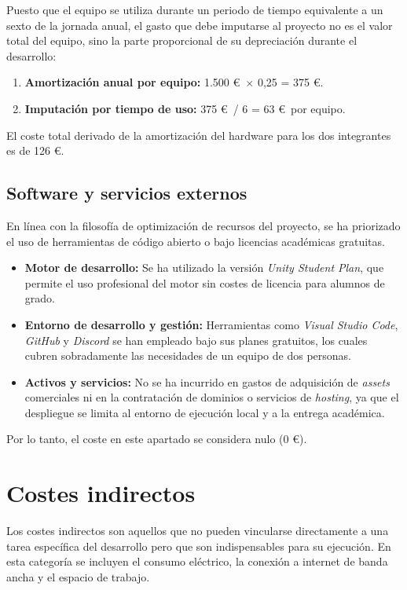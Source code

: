 Puesto que el equipo se utiliza durante un periodo de tiempo equivalente a un sexto de la jornada anual, el gasto que debe imputarse al proyecto no es el valor total del equipo, sino la parte proporcional de su depreciación durante el desarrollo:
\begin{enumerate}
    \item \textbf{Amortización anual por equipo:} 1.500 \euro\ $\times$ 0,25 = 375 \euro.
    \item \textbf{Imputación por tiempo de uso:} 375 \euro\ / 6 = 63 \euro\ por equipo.
\end{enumerate}
El coste total derivado de la amortización del hardware para los dos integrantes es de 126 \euro.

\subsection{Software y servicios externos}
En línea con la filosofía de optimización de recursos del proyecto, se ha priorizado el uso de herramientas de código abierto o bajo licencias académicas gratuitas. 
\begin{itemize}
    \item \textbf{Motor de desarrollo:} Se ha utilizado la versión \textit{Unity Student Plan}, que permite el uso profesional del motor sin costes de licencia para alumnos de grado.
    \item \textbf{Entorno de desarrollo y gestión:} Herramientas como \textit{Visual Studio Code}, \textit{GitHub} y \textit{Discord} se han empleado bajo sus planes gratuitos, los cuales cubren sobradamente las necesidades de un equipo de dos personas.
    \item \textbf{Activos y servicios:} No se ha incurrido en gastos de adquisición de \textit{assets} comerciales ni en la contratación de dominios o servicios de \textit{hosting}, ya que el despliegue se limita al entorno de ejecución local y a la entrega académica.
\end{itemize}
Por lo tanto, el coste en este apartado se considera nulo (0 \euro).

\section{Costes indirectos}
Los costes indirectos son aquellos que no pueden vincularse directamente a una tarea específica del desarrollo pero que son indispensables para su ejecución. En esta categoría se incluyen el consumo eléctrico, la conexión a internet de banda ancha y el espacio de trabajo.

